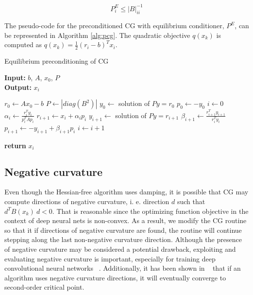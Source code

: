 \documentclass[10pt,twocolumn,letterpaper]{article}
\begin{document}
\begin{equation*}
\label{eq:preconditioner}
P_i^E \leq |B|_{ii}^{-1}
\end{equation*}

The pseudo-code for the preconditioned CG with equilibrium conditioner, $P^E$, can be represented in Algorithm \ref{alg:pcg}. The quadratic 
objective $q(x_k)$ is computed as $q(x_k) = \frac{1}{2}(r_i - b)^T x_i$.

\begin{algorithm}
\caption{Equilibrium preconditioning of CG}
\label{alg:pcg}
\hspace*{\algorithmicindent} \textbf{Input:} $b$, $A$, $x_0$, $P$  \\
\hspace*{\algorithmicindent} \textbf{Output:} $x_i$ 
  \begin{algorithmic}[1]
  \State $r_0 \gets Ax_0 - b$
   \State $P \gets  |diag(B^2)|$
  \State $y_0 \gets$ solution of $ Py = r_0$
 \State $p_0 \gets -y_0$
\State $i \gets 0$
        \State $\alpha_i \gets \frac{r_i^T y_i}{p_i^T Ap_i}$
  \State $r_{i+1}\gets x_i + \alpha_i p_i$
  \State $y_{i+1}\gets$ solution of $Py = r_{i+1}$
  \State $\beta_{i+1}\gets \frac{r_{i+1}^T y_{i+1}}{r_i^T y_i}$
 \State $p_{i+1} \gets -y_{i+1} + \beta_{i+1} p_i$
 \State $i \gets i+1$
      \EndWhile\label{euclidendwhile}

      \State \textbf{return} $x_i$

  \end{algorithmic}
\end{algorithm}





\subsection{Negative curvature}
\label{sec:negative_curvature}

Even though the Hessian-free algorithm uses damping, it is possible that CG may compute directions of negative curvature, i. e. direction $d$ such that $d^TB(x_k) \: d < 0 $. That is reasonable since the optimizing function objective in the context of deep neural nets is non-convex. As a result, we modify the CG routine so that it if directions of negative curvature are found, the routine will continue stepping along the last non-negative curvature direction. Although the presence of negative curvature may be considered a potential drawback, exploiting and evaluating negative curvature is important, especially for training deep convolutional neural networks ~\cite{Mizutani08}. Additionally, it has been shown in ~\cite{Olivare08} that if an algorithm uses negative curvature directions, it will eventually converge to second-order critical point.
\end{document}
